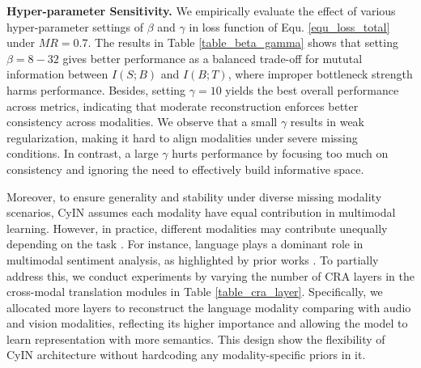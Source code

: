 \documentclass{article}
\begin{document}
\textbf{Hyper-parameter Sensitivity.}
We empirically evaluate the effect of various hyper-parameter settings of $\beta$ and $\gamma$ in loss function of Equ. \ref{equ_loss_total} under $MR=0.7$. The results in Table \ref{table_beta_gamma} shows that setting $\beta=8-32$ gives better performance as a balanced trade-off for mututal information between $I(S;B)$ and $I(B;T)$, where improper bottleneck strength harms performance. Besides, setting $\gamma=10$ yields the best overall performance across metrics, indicating that moderate reconstruction enforces better consistency across modalities. We observe that a small  $\gamma$ results in weak regularization, making it hard to align modalities under severe missing conditions. In contrast, a large $\gamma$ hurts performance by focusing too much on consistency and ignoring the need to effectively build informative space.

Moreover, to ensure generality and stability under diverse missing modality scenarios, CyIN assumes each modality have equal contribution in multimodal learning. However, in practice, different modalities may contribute unequally depending on the task \cite{peng2022Balanced}. For instance, language plays a dominant role in multimodal sentiment analysis, as highlighted by prior works \cite{lin2023mtmd,lian2024merbench,zhang2024towards}. To partially address this, we conduct experiments by varying the number of CRA layers in the cross-modal translation modules in Table \ref{table_cra_layer}. Specifically, we allocated more layers to reconstruct the language modality comparing with audio and vision modalities, reflecting its higher importance and allowing the model to learn representation with more semantics. This design show the flexibility of CyIN architecture without hardcoding any modality-specific priors in it. 
\end{document}
